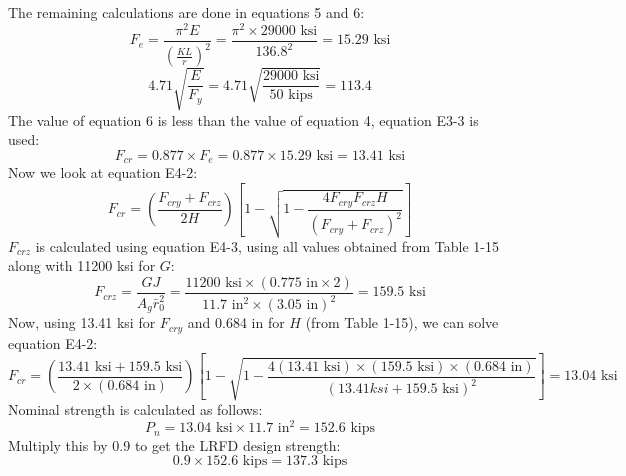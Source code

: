 \documentclass{article}
\begin{document}
The remaining calculations are done in equations 5 and 6: 
\begin{equation} 
    F_e=\frac{\pi^2E}{\left(\frac{KL}{r}\right)^2}=\frac{\pi^2\times29000\text{ ksi}}{136.8^2}=15.29\text{ ksi}
\end{equation}
\begin{equation} 
    4.71\sqrt{\frac{E}{F_y}}=4.71\sqrt{\frac{29000\text{ ksi}}{50\text{ kips}}}=113.4
\end{equation}
The value of equation 6 is less than the value of equation 4, equation E3-3 is used: 
\[F_{cr}=0.877\times F_e=0.877\times 15.29\text{ ksi}=13.41\text{ ksi}\]
Now we look at equation E4-2: 
\[F_{cr}=\left(\frac{F_{cry}+F_{crz}}{2H}\right)\left[1-\sqrt{1-\frac{4F_{cry}F_{crz}H}{(F_{cry}+F_{crz})^2}}\right]\]
$F_{crz}$ is calculated using equation E4-3, using all values obtained from Table 1-15 along with 11200 ksi for $G$: 
\[F_{crz}=\frac{GJ}{A_g\bar{r}_0^2}=\frac{11200\text{ ksi}\times (0.775\text{ in}\times 2)}{11.7\text{ in}^2\times (3.05\text{ in})^2}=159.5\text{ ksi}\]
Now, using 13.41 ksi for $F_{cry}$ and 0.684 in for $H$ (from Table 1-15), we can solve equation E4-2: 
\[F_{cr}=\left(\frac{13.41 \text{ ksi}+159.5\text{ ksi}}{2\times(0.684\text{ in})}\right)\left[1-\sqrt{1-\frac{4(13.41 \text{ ksi})\times(159.5\text{ ksi})\times(0.684\text{ in})}{(13.41 ksi+159.5\text{ ksi})^2}}\right]=13.04\text{ ksi}\]
Nominal strength is calculated as follows: 
\[P_n=13.04\text{ ksi}\times 11.7\text{ in}^2=152.6\text{ kips}\]
Multiply this by 0.9 to get the LRFD design strength: 
\[0.9\times 152.6\text{ kips}= \boxed{137.3\text{ kips}}\]
\end{document}

